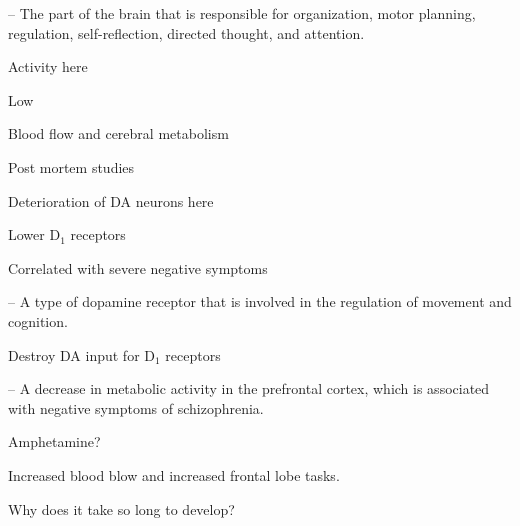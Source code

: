 \begin{coloredlist}
    \item {} -- The part of the brain that is responsible for organization, motor planning, regulation, self-reflection, directed thought, and attention.
    \begin{coloredlist}
        \item Activity here
        \begin{coloredlist}
            \item Low
            \begin{coloredlist}
                \item Blood flow and cerebral metabolism
            \end{coloredlist}
        \end{coloredlist}
        \item Post mortem studies
        \begin{coloredlist}
            \item Deterioration of DA neurons here
            \item Lower \(\text{D}_{1}\) receptors
            \begin{coloredlist}
                \item Correlated with severe negative symptoms
                \item {} -- A type of dopamine receptor that is involved in the regulation of movement and cognition.
            \end{coloredlist}
        \end{coloredlist}
        \item Destroy DA input for \(\text{D}_{1}\) receptors
        \begin{coloredlist}
            \item {} -- A decrease in metabolic activity in the prefrontal cortex, which is associated with negative symptoms of schizophrenia.
            \item Amphetamine?
            \begin{coloredlist}
                \item Increased blood blow and increased frontal lobe tasks.
            \end{coloredlist}
        \end{coloredlist}
        \item Why does it take so long to develop?
        \begin{coloredlist}

\end{coloredlist}
\end{coloredlist}
\end{coloredlist}
